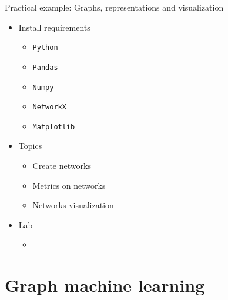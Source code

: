 \documentclass[aspectratio=169]{beamer}
\begin{document}
    \begin{frame}{Practical example: Graphs, representations and visualization}
        \begin{itemize}
            \item Install requirements
                \begin{itemize}
                    \item \texttt{Python}
                    \item \texttt{Pandas}
                    \item \texttt{Numpy}
                    \item \texttt{NetworkX}
                    \item \texttt{Matplotlib}
                \end{itemize}
            \item Topics 
                \begin{itemize}
                    \item Create networks
                    \item Metrics on networks
                    \item Networks visualization
                \end{itemize}
            \item Lab
                \begin{itemize}
                    \item              
                        \href{https://drive.google.com/file/d/199QkU5jbJrrg4URuxGU8wGuvIF91y1mo/view?usp=sharing}{
                        }
                \end{itemize}
        \end{itemize}
    \end{frame}

\section{Graph machine learning}
\end{document}
